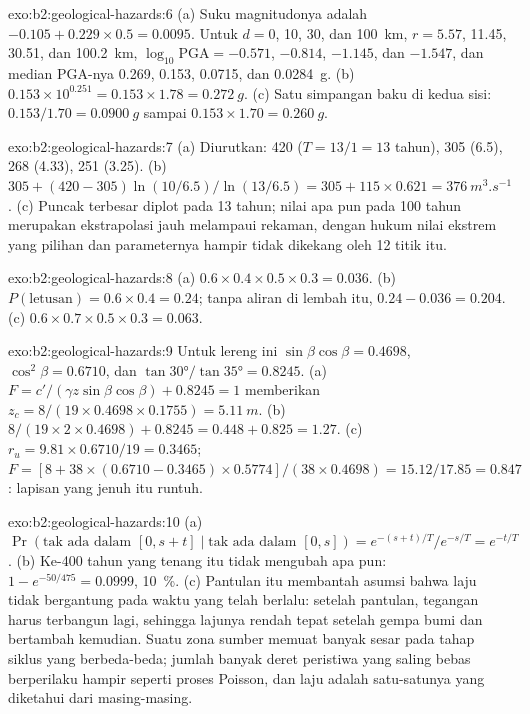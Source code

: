 \begin{solution}{exo:b2:geological-hazards:6}
(a) Suku magnitudonya adalah $-0.105 + 0.229 \times 0.5 = 0.0095$. Untuk $d = 0$, 10, 30, dan
\qty{100}{km}, $r = 5.57$, 11.45, 30.51, dan \qty{100.2}{km}, $\log_{10}\mathrm{PGA} = -0.571$,
$-0.814$, $-1.145$, dan $-1.547$, dan median PGA-nya 0.269, 0.153, 0.0715, dan \qty{0.0284}{g}.
(b) $0.153 \times 10^{0.251} = 0.153 \times 1.78 = \qty{0.272}{g}$. (c) Satu simpangan baku
di kedua sisi: $0.153/1.70 = \qty{0.0900}{g}$ sampai $0.153 \times 1.70 = \qty{0.260}{g}$.
\end{solution}

\begin{solution}{exo:b2:geological-hazards:7}
(a) Diurutkan: 420 ($T = 13/1 = 13$ tahun), 305 (6.5), 268 (4.33), 251 (3.25). (b) $305 + (420 -
305)\ln(10/6.5)/\ln(13/6.5) = 305 + 115 \times 0.621 = \qty{376}{m^3.s^{-1}}$. (c) Puncak terbesar
diplot pada 13 tahun; nilai apa pun pada 100 tahun merupakan ekstrapolasi jauh melampaui rekaman, dengan hukum
nilai ekstrem yang pilihan dan parameternya hampir tidak dikekang oleh 12 titik itu.
\end{solution}

\begin{solution}{exo:b2:geological-hazards:8}
(a) $0.6 \times 0.4 \times 0.5 \times 0.3 = 0.036$. (b) $P(\text{letusan}) = 0.6 \times 0.4 = 0.24$;
tanpa aliran di lembah itu, $0.24 - 0.036 = 0.204$. (c) $0.6 \times 0.7 \times 0.5 \times 0.3 =
0.063$.
\end{solution}

\begin{solution}{exo:b2:geological-hazards:9}
Untuk lereng ini $\sin\beta\cos\beta = 0.4698$, $\cos^2\beta = 0.6710$, dan $\tan\ang{30}/\tan\ang{35} =
0.8245$. (a) $F = c'/(\gamma z\sin\beta\cos\beta) + 0.8245 = 1$ memberikan $z_c = 8/(19 \times 0.4698
\times 0.1755) = \qty{5.11}{m}$. (b) $8/(19 \times 2 \times 0.4698) + 0.8245 = 0.448 + 0.825 =
1.27$. (c) $r_u = 9.81 \times 0.6710/19 = 0.3465$; $F = [8 + 38 \times (0.6710 - 0.3465) \times
0.5774]/(38 \times 0.4698) = 15.12/17.85 = 0.847$: lapisan yang jenuh itu runtuh.
\end{solution}

\begin{solution}{exo:b2:geological-hazards:10}
(a) $\Pr(\text{tak ada dalam } [0, s+t] \mid \text{tak ada dalam } [0, s]) = e^{-(s+t)/T}/e^{-s/T} = e^{-t/T}$.
(b) Ke-400 tahun yang tenang itu tidak mengubah apa pun: $1 - e^{-50/475} = 0.0999$, \qty{10}{\percent}. (c) Pantulan itu
membantah asumsi bahwa laju tidak bergantung pada waktu yang telah berlalu: setelah pantulan,
tegangan harus terbangun lagi, sehingga lajunya rendah tepat setelah gempa bumi dan bertambah kemudian. Suatu zona
sumber memuat banyak sesar pada tahap siklus yang berbeda-beda; jumlah banyak deret peristiwa yang saling bebas
berperilaku hampir seperti proses Poisson, dan laju adalah satu-satunya yang diketahui dari masing-masing.
\end{solution}

